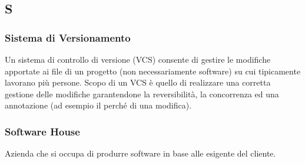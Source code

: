 \subsection*{\textbf{\hfill \Huge{S} \hfill}} 
\subsubsection*{Sistema di Versionamento}
Un sistema di controllo di versione (VCS) consente di gestire le modifiche apportate ai file di un progetto (non necessariamente software) su cui tipicamente lavorano più persone. Scopo di un VCS è quello di realizzare una corretta gestione delle modifiche garantendone la reversibilità, la concorrenza ed una annotazione (ad esempio il perché di una modifica).

\subsubsection*{Software House}
Azienda che si occupa di produrre software in base alle esigente del cliente.